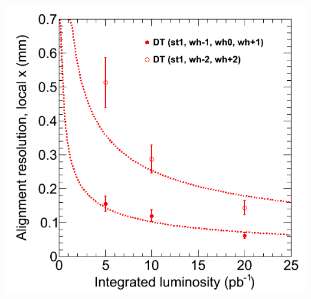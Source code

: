\documentclass[compress]{beamer}
\begin{document}
\begin{frame}
\begin{columns}
\includegraphics[width=\linewidth]{station1_resolution.png}
\end{columns}
\end{frame}
\end{document}
